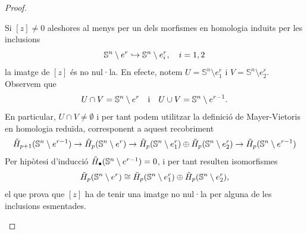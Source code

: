 \documentclass[../main.tex]{subfiles}
\begin{document}
\begin{proof}
\begin{enumerate}
    Si $[z]\not=0$ aleshores al menys per un dels morfismes en homologia induits per les inclusions
    \begin{equation}
        \notag
        \mathbb{S}^n\setminus e^r\hookrightarrow \mathbb{S}^n\setminus e_i^r,\quad i=1,2
    \end{equation}
    la imatge de $[z]$ és no nul·la. En efecte, notem $U = \mathbb{S}^n\setminus e_1^r$ i $V= \mathbb{S}^n\setminus e_2^r$. Observem que 
    \begin{equation}
        \notag
        U\cap V = \mathbb{S}^n\setminus e^r\quad \text{i}\quad U\cup V = \mathbb{S}^n\setminus e^{r-1}.
    \end{equation}
    En particular, $U\cap V\not=\emptyset$ i per tant podem utilitzar la definició de Mayer-Vietoris en homologia reduïda, corresponent a aquest recobriment
    \begin{equation}
        \notag
        \Tilde{H}_{p+1}(\mathbb{S}^n\setminus e^{r-1})\rightarrow \Tilde{H}_p(\mathbb{S}^n\setminus e^r)\rightarrow \Tilde{H}_p(\mathbb{S}^n\setminus e_1^r)\oplus \Tilde{H}_p(\mathbb{S}^n\setminus e_2^r)\rightarrow\Tilde{H}_p(\mathbb{S}^n\setminus e^{r-1})
    \end{equation}
    Per hipòtesi d'inducció $\Tilde{H}_\bullet(\mathbb{S}^n\setminus e^{r-1}) =0$, i per tant resulten isomorfismes
    \begin{equation}
        \notag
        \Tilde{H}_p(\mathbb{S}^n\setminus e^r)\cong \Tilde{H}_p(\mathbb{S}^n\setminus e_1^r)\oplus \Tilde{H}_p(\mathbb{S}^n\setminus e_2^r),
    \end{equation}
    el que prova que $[z]$ ha de tenir una imatge no nul·la per alguna de les inclusions esmentades.
    

\end{enumerate}
\end{proof}
\end{document}

